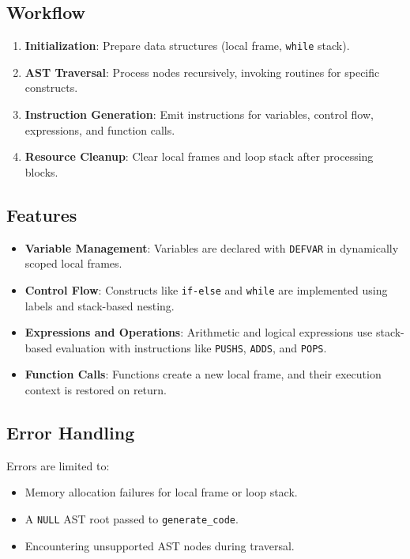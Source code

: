\documentclass[12pt,a4paper]{article}
\begin{document}
\subsection{Workflow}
\begin{enumerate}
    \item \textbf{Initialization}: Prepare data structures (local frame, \texttt{while} stack).
    \item \textbf{AST Traversal}: Process nodes recursively, invoking routines for specific constructs.
    \item \textbf{Instruction Generation}: Emit instructions for variables, control flow, expressions, and function calls.
    \item \textbf{Resource Cleanup}: Clear local frames and loop stack after processing blocks.
\end{enumerate}

\subsection{Features}
\begin{itemize}
    \item \textbf{Variable Management}: Variables are declared with \texttt{DEFVAR} in dynamically scoped local frames.
    \item \textbf{Control Flow}: Constructs like \texttt{if-else} and \texttt{while} are implemented using labels and stack-based nesting.
    \item \textbf{Expressions and Operations}: Arithmetic and logical expressions use stack-based evaluation with instructions like \texttt{PUSHS}, \texttt{ADDS}, and \texttt{POPS}.
    \item \textbf{Function Calls}: Functions create a new local frame, and their execution context is restored on return.
\end{itemize}

\subsection{Error Handling}
Errors are limited to:
\begin{itemize}
    \item Memory allocation failures for local frame or loop stack.
    \item A \texttt{NULL} AST root passed to \texttt{generate\_code}.
    \item Encountering unsupported AST nodes during traversal.
\end{itemize}

\printbibliography
\end{document}

